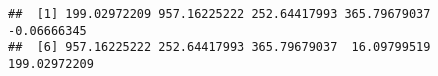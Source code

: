 \begin{knitrout}
\color{fgcolor}\begin{kframe}
\begin{alltt}
 \hlkwb{<-}  \hlopt{*}  \hlopt{-}  \hlopt{-} \hlstd{)} \hlopt{*} 

\hlstd{pseudo[}\hlopt{:}\hlstd{]}
\end{alltt}
\begin{verbatim}
##  [1] 199.02972209 957.16225222 252.64417993 365.79679037  -0.06666345
##  [6] 957.16225222 252.64417993 365.79679037  16.09799519 199.02972209
\end{verbatim}
\end{kframe}
\end{knitrout}
